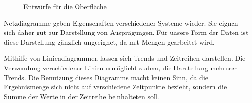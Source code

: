 \begin{figure}[H]
\hfill
{}\hfill
{}
\caption{Entwürfe für die Oberfläche}
\label{konzept_darstellung}
\end{figure}

Netzdiagramme geben Eigenschaften verschiedener Systeme wieder. Sie eignen sich daher gut zur Darstellung von Ausprägungen. Für unsere Form der Daten ist diese Darstellung gänzlich ungeeignet, da mit Mengen gearbeitet wird. 

Mithilfe von Liniendiagrammen lassen sich Trends und Zeitreihen darstellen. Die Verwendung verschiedener Linien ermöglicht zudem, die Darstellung mehrerer Trends. Die Benutzung dieses Diagramms macht keinen Sinn, da die Ergebnismenge sich nicht auf verschiedene Zeitpunkte bezieht, sondern die Summe der Werte in der Zeitreihe beinhalteten soll. 

